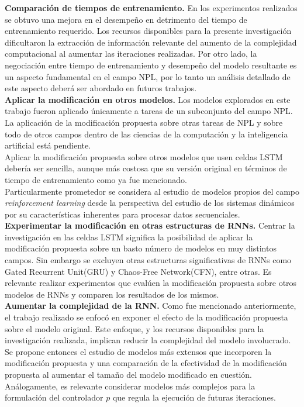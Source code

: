 \documentclass{article}
\begin{document}
	\textbf{Comparación de tiempos de entrenamiento.} En los experimentos realizados se obtuvo una mejora en el desempeño en detrimento del tiempo de entrenamiento requerido. Los recursos disponibles para la presente investigación dificultaron la extracción de información relevante del aumento de la complejidad computacional al aumentar las iteraciones realizadas. Por otro lado, la negociación entre tiempo de entrenamiento y desempeño del modelo resultante es un aspecto fundamental en el campo NPL, por lo tanto un análisis detallado de este aspecto deberá ser abordado en futuros trabajos.\\
	
	\textbf{Aplicar la modificación en otros modelos.} Los modelos explorados en este trabajo fueron aplicado únicamente a tareas de un subconjunto del campo NPL. La aplicación de la modificación propuesta sobre otras tareas de NPL y sobre todo de otros campos dentro de las ciencias de la computación y la inteligencia artificial está pendiente. \\
	Aplicar la modificación propuesta sobre otros modelos que usen celdas LSTM debería ser sencilla, aunque más costosa que su versión original en términos de tiempo de entrenamiento como ya fue mencionado.\\
	Particularmente prometedor se considera al estudio de modelos propios del campo \textit{reinforcement learning} desde la perspectiva del estudio de los sistemas dinámicos por su características inherentes para procesar datos secuenciales.\\
	
	\textbf{Experimentar la modificación en otras estructuras de RNNs.} Centrar la investigación en las celdas LSTM significa la posibilidad de aplicar la modificación propuesta sobre un basto número de modelos en muy distintos campos. Sin embargo se excluyen otras estructuras significativas de RNNs como Gated Recurrent Unit(GRU) y Chaos-Free Network(CFN), entre otras. Es relevante realizar experimentos que evalúen la modificación propuesta sobre otros modelos de RNNs y comparen los resultados de los mismos.\\
	
	\textbf{Aumentar la complejidad de la RNN.} Como fue mencionado anteriormente, el trabajo realizado se enfocó en exponer el efecto de la modificación propuesta sobre el modelo original. Este enfoque, y los recursos disponibles para la investigación realizada, implican reducir la complejidad del modelo involucrado.\\
	Se propone entonces el estudio de modelos más extensos que incorporen la modificación propuesta y una comparación de la efectividad de la modificación propuesta al aumentar el tamaño del modelo modificado en cuestión. \\
	Análogamente, es relevante considerar modelos más complejos para la formulación del controlador $p$ que regula la ejecución de futuras iteraciones.\\
	
\end{document}
